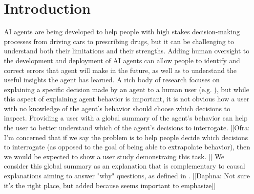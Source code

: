 \documentclass{article}
\newcommand{\comment}[2]{{\color{blue} [[{#1}: {#2}]]}}
\begin{document}
\section{Introduction}

AI agents are being developed to help people with high stakes decision-making processes from driving cars to prescribing drugs, but it can be challenging to understand both their limitations and their strengths.  Adding human oversight to the development and deployment of AI agents can allow people to identify and correct errors that agent will make in the future, as well as to understand the useful insights the agent has learned.  A rich body of research focuses on explaining a specific decision made by an agent to a human user (e.g. \cite{khan2009minimal,lomas2012explaining,dodson2011natural,broekens2010explain}), but while this aspect of explaining agent behavior is important, it is not obvious how a user with no knowledge of the agent's behavior should choose which decisions to inspect.  Providing a user with a global summary of the agent's behavior can help the user to better understand which of the agent's decisions to interrogate.  \comment{Ofra}{I'm concerned that if we say the problem is to help people decide which decisions to interrogate (as opposed to the goal of being able to extrapolate behavior), then we would be expected to show a user study demonstraing this task. } We consider this global summary as an explanation that is  complementary to causal explanations aiming to answer "why" questions, as defined in \cite{miller2018explanation}. \comment{Daphna}{Not sure it's the right place, but added because seems important to emphasize}     

\end{document}
